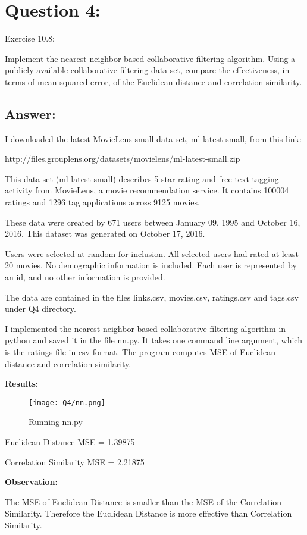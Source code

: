 \section*{Question 4:}
Exercise 10.8:

Implement the nearest neighbor-based collaborative filtering algorithm. Using a publicly available collaborative filtering data set, compare the effectiveness, in terms of mean squared error, of the Euclidean distance and correlation similarity.

\subsection*{Answer:}

I downloaded the latest MovieLens small data set, ml-latest-small, from this link:

http://files.grouplens.org/datasets/movielens/ml-latest-small.zip

This data set (ml-latest-small) describes 5-star rating and free-text tagging activity from MovieLens, a movie recommendation service. It contains 100004 ratings and 1296 tag applications across 9125 movies.

These data were created by 671 users between January 09, 1995 and October 16, 2016. This dataset was generated on October 17, 2016.

Users were selected at random for inclusion. All selected users had rated at least 20 movies. No demographic information is included. Each user is represented by an id, and no other information is provided.

The data are contained in the files links.csv, movies.csv, ratings.csv and tags.csv under Q4 directory. 

I implemented the nearest neighbor-based collaborative filtering algorithm in python and saved it in the file nn.py. It takes one command line argument, which is the ratings file in csv format. The program computes MSE of Euclidean distance and correlation similarity.




\textbf{Results:}

\begin{figure}[h]
\caption{Running nn.py}
\centering
\texttt{[image: Q4/nn.png]}
\end{figure}

Euclidean Distance MSE = 1.39875

Correlation Similarity MSE = 2.21875

\textbf{Observation:}

The MSE of Euclidean Distance is smaller than the MSE of the Correlation Similarity. Therefore the Euclidean Distance is more effective than Correlation Similarity.
